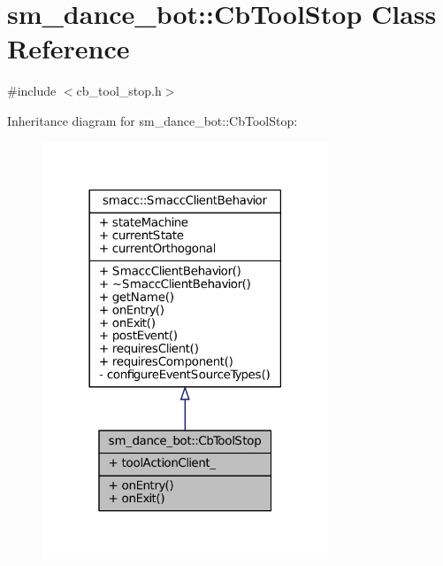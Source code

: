 \hypertarget{classsm__dance__bot_1_1CbToolStop}{}\section{sm\+\_\+dance\+\_\+bot\+:\+:Cb\+Tool\+Stop Class Reference}
\label{classsm__dance__bot_1_1CbToolStop}


{\ttfamily \#include $<$cb\+\_\+tool\+\_\+stop.\+h$>$}



Inheritance diagram for sm\+\_\+dance\+\_\+bot\+:\+:Cb\+Tool\+Stop\+:
\nopagebreak
\begin{figure}[H]
\begin{center}
\leavevmode
\includegraphics[width=242pt]{classsm__dance__bot_1_1CbToolStop__inherit__graph}
\end{center}
\end{figure}


